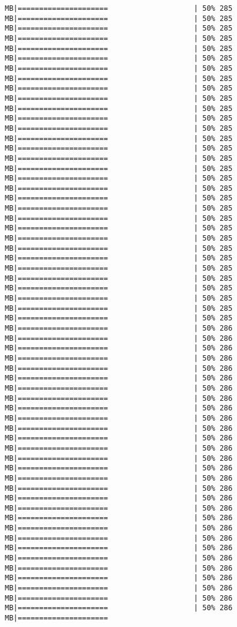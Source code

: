\documentclass[
]{article}
\begin{document}
\begin{verbatim}
MB|=====================                    | 50% 285 MB|=====================                    | 50% 285 MB|=====================                    | 50% 285 MB|=====================                    | 50% 285 MB|=====================                    | 50% 285 MB|=====================                    | 50% 285 MB|=====================                    | 50% 285 MB|=====================                    | 50% 285 MB|=====================                    | 50% 285 MB|=====================                    | 50% 285 MB|=====================                    | 50% 285 MB|=====================                    | 50% 285 MB|=====================                    | 50% 285 MB|=====================                    | 50% 285 MB|=====================                    | 50% 285 MB|=====================                    | 50% 285 MB|=====================                    | 50% 285 MB|=====================                    | 50% 285 MB|=====================                    | 50% 285 MB|=====================                    | 50% 285 MB|=====================                    | 50% 285 MB|=====================                    | 50% 285 MB|=====================                    | 50% 285 MB|=====================                    | 50% 285 MB|=====================                    | 50% 285 MB|=====================                    | 50% 285 MB|=====================                    | 50% 285 MB|=====================                    | 50% 285 MB|=====================                    | 50% 285 MB|=====================                    | 50% 285 MB|=====================                    | 50% 285 MB|=====================                    | 50% 285 MB|=====================                    | 50% 286 MB|=====================                    | 50% 286 MB|=====================                    | 50% 286 MB|=====================                    | 50% 286 MB|=====================                    | 50% 286 MB|=====================                    | 50% 286 MB|=====================                    | 50% 286 MB|=====================                    | 50% 286 MB|=====================                    | 50% 286 MB|=====================                    | 50% 286 MB|=====================                    | 50% 286 MB|=====================                    | 50% 286 MB|=====================                    | 50% 286 MB|=====================                    | 50% 286 MB|=====================                    | 50% 286 MB|=====================                    | 50% 286 MB|=====================                    | 50% 286 MB|=====================                    | 50% 286 MB|=====================                    | 50% 286 MB|=====================                    | 50% 286 MB|=====================                    | 50% 286 MB|=====================                    | 50% 286 MB|=====================                    | 50% 286 MB|=====================                    | 50% 286 MB|=====================                    | 50% 286 MB|=====================                    | 50% 286 MB|=====================                    | 50% 286 MB|=====================                    | 50% 286 MB|=====================                    | 50% 286 MB|===================== 
\end{verbatim}
\end{document}
